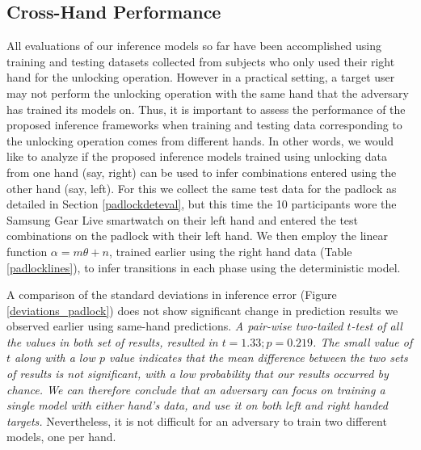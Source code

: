\documentclass[]{IEEEtran}
\begin{document}
\subsection{Cross-Hand Performance}
\label{eval:controlledcrosshand}
All evaluations of our inference models so far have been accomplished using training and testing datasets collected from subjects who only used their right hand for the unlocking operation.
However in a practical setting, a target user may not perform the unlocking operation with the same hand that the adversary has trained its models on. Thus, it is important to assess the performance of the proposed inference frameworks when training and testing data corresponding to the unlocking operation comes from different hands. In other words, we would like to analyze if the proposed inference models trained using unlocking data from one hand (say, right) can be used to infer combinations entered using the other hand (say, left). For this we collect the same test data for the padlock as detailed in Section \ref{padlockdeteval}, but this time the 10 participants wore the Samsung Gear Live smartwatch on their left hand and entered the test combinations on the padlock with their left hand. We then employ the linear function $\alpha=m\theta+n$, trained earlier using the right hand data (Table \ref{padlocklines}), to infer transitions in each phase using the deterministic model.

A comparison of the standard deviations in inference error (Figure \ref{deviations_padlock}) does not show significant change in prediction results we observed earlier using same-hand predictions. \emph{A pair-wise two-tailed $t$-test of all the values in both set of results, resulted in $t=1.33;p=0.219$. The small value of $t$ along with a low $p$ value indicates that the mean difference between the two sets of results is not significant, with a low probability that our results occurred by chance. We can therefore conclude that an adversary can focus on training a single model with either hand's data, and use it on both left and right handed targets.} Nevertheless, it is not difficult for an adversary to train two different models, one per hand.
\end{document}
